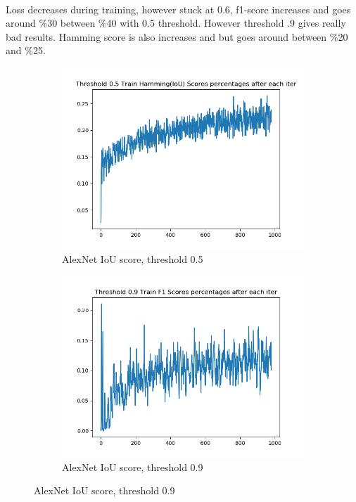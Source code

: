 \documentclass[12pt]{article}
\begin{document}
\paragraph{}Loss decreases during training, however stuck at 0.6, f1-score increases and goes around \%30 between \%40 with 0.5 threshold. However threshold .9 gives really bad results. Hamming score is also increases and but goes around between \%20 and \%25.
\begin{figure}[!ht]
\centering
\begin{subfigure}{.5\textwidth}
	\centering
	\includegraphics[width=1\linewidth]{alexnet-lazy-1_0-train-scores-hs-5.png}
	\caption{\label{alexnet:alexnet-lazy-1_0-train-scores-hs-5}AlexNet IoU score, threshold 0.5}
\end{subfigure}%
\begin{subfigure}{.5\textwidth}
	\centering
	\includegraphics[width=1\linewidth]{alexnet-lazy-1_0-train-scores-f1-9.png}
	\caption{\label{alexnet:alexnet-lazy-1_0-train-scores-hs-9}AlexNet IoU score, threshold 0.9}
\end{subfigure}
\end{figure}
\end{document}
